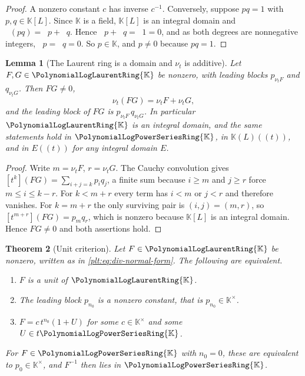 \documentclass[11pt,oneside]{article}
\theoremstyle{plain}
\newtheorem{theorem}{Theorem}[section]
\newtheorem{lemma}[theorem]{Lemma}
\theoremstyle{definition}
\theoremstyle{remark}
\newcommand{\K}{\mathbb{K}}
\newcommand{\PLpow}{\PolynomialLogPowerSeriesRing{\K}}   %
\newcommand{\PLlau}{\PolynomialLogLaurentRing{\K}}       %
\newcommand{\ordt}{\nu_{t}}                              %
\DeclareMathOperator{\degL}{deg_{L}}
\begin{document}
\begin{proof}
A nonzero constant \(c\) has inverse \(c^{-1}\).  Conversely, suppose
\(pq=1\) with \(p,q\in\K[L]\).  Since \(\K\) is a field, \(\K[L]\) is an
integral domain and \(\degL(pq)=\degL p+\degL q\).  Hence
\(\degL p+\degL q=\degL 1=0\), and as both degrees are nonnegative integers,
\(\degL p=\degL q=0\).  So \(p\in\K\), and \(p\ne0\) because \(pq=1\).
\end{proof}

\begin{lemma}[The Laurent ring is a domain and \(\ordt\) is additive]
\label{plt:lem:div-valuation}
Let \(F,G\in\PLlau\) be nonzero, with leading blocks \(p_{\ordt F}\) and
\(q_{\ordt G}\).  Then \(FG\ne0\),
\begin{equation}\label{plt:eq:div-valuation-additive}
  \ordt(FG)=\ordt F+\ordt G,
\end{equation}
and the leading block of \(FG\) is \(p_{\ordt F}\,q_{\ordt G}\).  In particular
\(\PLlau\) is an integral domain, and the same statements hold in \(\PLpow\),
in \(\K(L)((t))\), and in \(E((t))\) for any integral domain \(E\).
\end{lemma}

\begin{proof}
Write \(m=\ordt F\), \(r=\ordt G\).  The Cauchy convolution gives
\([t^{k}](FG)=\sum_{i+j=k}p_{i}q_{j}\), a finite sum because \(i\ge m\) and
\(j\ge r\) force \(m\le i\le k-r\).  For \(k<m+r\) every term has \(i<m\) or
\(j<r\) and therefore vanishes.  For \(k=m+r\) the only surviving pair is
\((i,j)=(m,r)\), so \([t^{m+r}](FG)=p_{m}q_{r}\), which is nonzero because
\(\K[L]\) is an integral domain.  Hence \(FG\ne0\) and both assertions hold.
\end{proof}

\begin{theorem}[Unit criterion]\label{plt:thm:div-unit-criterion}
Let \(F\in\PLlau\) be nonzero, written as in \cref{plt:eq:div-normal-form}.
The following are equivalent.
\begin{enumerate}
\item \(F\) is a unit of \(\PLlau\).
\item The leading block \(p_{n_{0}}\) is a nonzero constant, that is
      \(p_{n_{0}}\in\K^{\times}\).
\item \(F=c\,t^{n_{0}}(1+U)\) for some \(c\in\K^{\times}\) and some
      \(U\in t\PLpow\).
\end{enumerate}
For \(F\in\PLpow\) with \(n_{0}=0\), these are equivalent to \(p_{0}\in
\K^{\times}\), and \(F^{-1}\) then lies in \(\PLpow\).
\end{theorem}
\end{document}
